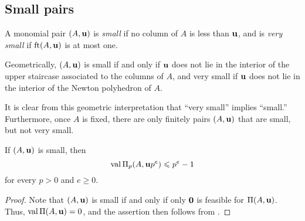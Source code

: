 \documentclass[11pt]{amsart}
\begin{document}
\subsection{Small pairs}



\begin{definition}
A monomial pair $(A, \mathbf{u})$ is \emph{small} if no column of $A$ is less than $\mathbf{u}$, and is \emph{very small} if $\operatorname{ft}(A, \mathbf{u})$ is at most one.
\end{definition}

\begin{remark}
\label{finitely many small but not very small: R}
Geometrically, $(A, \mathbf{u})$ is small if and only if $\mathbf{u}$ does not lie in the interior of the upper staircase associated to the columns of $A$, and very small if $\mathbf{u}$ does not lie in the interior of the Newton polyhedron of $A$.  

It is clear from this geometric interpretation that ``very small'' implies ``small.''  Furthermore, once $A$ is fixed, there are only finitely pairs $(A, \mathbf{u})$ that are small, but not very small. 
\end{remark}

\begin{lemma}
\label{trivial value bound: L}
If $(A, \mathbf{u})$ is small, then 
 \[ \operatorname{val} \Pi_p(A, \mathbf{u}p^e) \leqslant p^{e} -1 \] for every $p > 0$ and $e \geq 0$.
\end{lemma}


\begin{proof}
Note that $(A, \mathbf{u})$ is small if and only if only $\mathbf{0}$ is feasible for $\Pi(A, \mathbf{u})$.   Thus, $\operatorname{val} \Pi(A, \mathbf{u}) = 0$, and the assertion then follows from .
\end{proof}

\end{document}
